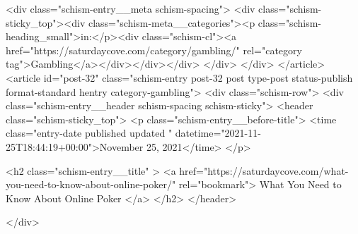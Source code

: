 {		<div class="schism-entry__meta schism-spacing">			<div class="schism-sticky_top"><div class="schism-meta__categories"><p class="schism-heading_small">in:</p><div class="schism-cl"><a href="https://saturdaycove.com/category/gambling/" rel="category tag">Gambling</a></div></div></div>		</div>
	</div>
</article>
<article id="post-32" class="schism-entry post-32 post type-post status-publish format-standard hentry category-gambling">
	<div class="schism-row">		<div class="schism-entry__header schism-spacing schism-sticky">			<header class="schism-sticky_top">				<p class="schism-entry__before-title">
					<time class="entry-date published updated " datetime="2021-11-25T18:44:19+00:00">November 25, 2021</time>				</p>

				<h2 class="schism-entry__title" >
					<a href="https://saturdaycove.com/what-you-need-to-know-about-online-poker/" rel="bookmark">
						What You Need to Know About Online Poker					</a>
				</h2>
			</header>

					</div>

}
